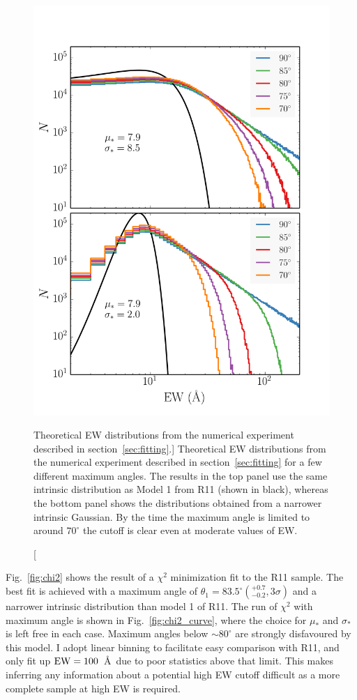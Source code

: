 \begin{figure}
\centering
\includegraphics[width=1.0\textwidth]{figures/ewpaper/cutoff.png}
\caption
[Theoretical EW distributions from the numerical experiment 
described in section~\ref{sec:fitting}.]
{
Theoretical EW distributions from the numerical experiment 
described in section~\ref{sec:fitting} for a few different 
maximum angles. The results in the top panel use the same intrinsic
distribution as Model 1 from R11 (shown in black), 
whereas the bottom panel shows the distributions 
obtained from a narrower intrinsic Gaussian. By the time the maximum
angle is limited to around $70^\circ$ the cutoff is
clear even at moderate values of EW.
}
\label{fig:cutoff}
\end{figure}

Fig.~\ref{fig:chi2} shows the result of a $\chi^2$ minimization fit 
to the R11 sample. The best fit is achieved with a maximum angle of 
$\theta_{1}=83.5^\circ(^{+0.7}_{-0.2}, 3\sigma)$ and a narrower intrinsic distribution
than model 1 of R11. The run of $\chi^2$ with maximum angle
is shown in Fig.~\ref{fig:chi2_curve}, where the choice for $\mu_*$
and $\sigma_*$ is left free in each case. 
Maximum angles below $\sim80^\circ$ are strongly disfavoured
by this model. I adopt linear binning to facilitate easy comparison 
with R11, and only fit up ${\rm EW}=100$~\AA\
due to poor statistics above that limit. This 
makes inferring any information about a potential high EW cutoff 
difficult as a more complete sample at high EW is required. 

